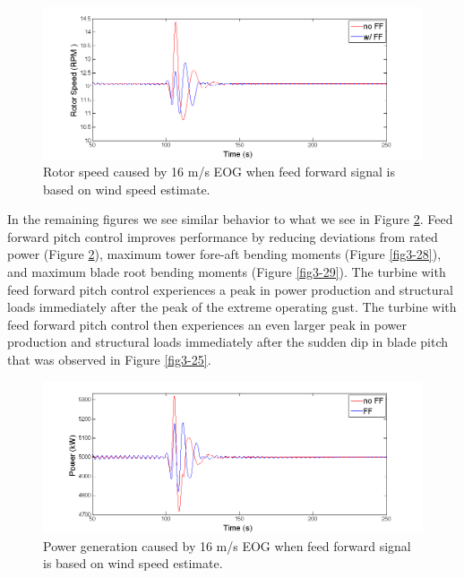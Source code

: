\begin{figure}[htb]
	\centering
		\includegraphics[width = \linewidth]{Figures/ch3Figures/fig3-26.png}
		
	\caption{Rotor speed caused by 16 m/s EOG when feed forward signal is based on wind speed estimate.}
	\label{fig3-26}
\end{figure}

In the remaining figures we see similar behavior to what we see in Figure \ref{fig3-27}. Feed forward pitch control improves performance by reducing deviations from rated power (Figure \ref{fig3-27}), maximum tower fore-aft bending moments (Figure \ref{fig3-28}), and maximum blade root bending moments (Figure \ref{fig3-29}). The turbine with feed forward pitch control experiences a peak in power production and structural loads immediately after the peak of the extreme operating gust. The turbine with feed forward pitch control then experiences an even larger peak in power production and structural loads immediately after the sudden dip in blade pitch that was observed in Figure \ref{fig3-25}.

\begin{figure}[htb]
	\centering
		\includegraphics[width = \linewidth]{Figures/ch3Figures/fig3-27.png}
		
	\caption{Power generation caused by 16 m/s EOG when feed forward signal is based on wind speed estimate.}
	\label{fig3-27}
\end{figure}

